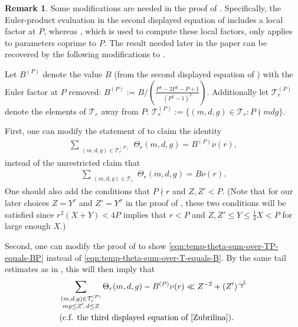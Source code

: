 \documentclass[12pt,letterpaper,reqno]{amsart}
\theoremstyle{plain}
\theoremstyle{definition}
\newtheorem{remark}[theorem]{Remark}
\numberwithin{equation}{section}
\numberwithin{figure}{section}
\numberwithin{table}{section}
\newcommand{\lrp}[1]{\!\left(#1\right)}
\begin{document}
\begin{remark}
    Some modifications are needed in the proof of
    \cite[Proposition 3.6]{Zubrilina}. Specifically, the Euler-product
    evaluation in the second displayed equation of
    \cite[Lemma 3.10]{Zubrilina} includes a local factor at $P$, whereas
    \cite[Lemma 3.8]{Zubrilina}, which is used to compute these local
    factors, only applies to parameters coprime to $P$.
    The result needed later in the paper can be recovered by the
    following modifications to \cite[Lemma 3.10]{Zubrilina}.

    Let $B^{(P)}$ denote the value $B$ (from the second displayed equation of \cite[Lemma 3.10]{Zubrilina}) with the Euler factor at $P$ removed: $B^{(P)} := B / \lrp{\frac{P^4-2P^2-P+1}{(P^2-1)^2}}$. Additionally let $\mathcal{T}_r^{(P)}$ denote the elements of $\mathcal{T}_r$ away from $P$: $\mathcal{T}_r^{(P)} := \{(m,d,g) \in \mathcal{T}_r : P \nmid mdg\}$.

    First, one can modify the statement of \cite[Lemma 3.10]{Zubrilina}  to claim the identity
    \begin{align}
        \label{eqn:temp-theta-sum-over-TP-equals-BP}
        \sum_{\substack{(m,d,g) \in \mathcal{T}_r^{(P)}}} \Theta_r(m,d,g) = B^{(P)} \nu(r),
    \end{align}
    instead of the unrestricted claim that
    \begin{align}
        \label{eqn:temp-theta-sum-over-T-equals-B}
        \sum_{\substack{(m,d,g) \in \mathcal{T}_r}} \Theta_r(m,d,g) = B \nu(r).
    \end{align}
    One should also add the conditions that $P\nmid r$ and $Z,Z'<P$. (Note that for our later choices $Z=Y^\tau$ and $Z'=Y^\sigma$ in the proof of \cite[Proposition 3.12]{Zubrilina},
    these two conditions will be satisfied 
    since $r^2(X+Y)<4P$ implies that $r < P$ and $Z,Z' \le Y \le \frac{1}{4} X < P$ for large enough $X$.)

    Second, one can modify the proof of \cite[Lemma 3.10]{Zubrilina} to show \eqref{eqn:temp-theta-sum-over-TP-equals-BP} instead of \eqref{eqn:temp-theta-sum-over-T-equals-B}. By the same tail estimates as in \cite[Lemma 3.10]{Zubrilina}, this will then imply that
        \begin{align}
            &\sum_{\substack{(m,d,g) \in \mathcal{T}_r^{(P)} \\
            mg \le Z'\!,\, d \le Z}} \Theta_r(m,d,g)  - B^{(P)} \nu(r) \ll Z^{-2} + (Z')^{\frac{-1}{5}} \label{eqn:temp-modified-tail-estimate-Zub-Lemma-3.10} \\
            &\text{(c.f. the third displayed equation of \cite[Lemma 3.10]{Zubrilina})}.
        \end{align}
        

\end{remark}
\end{document}
